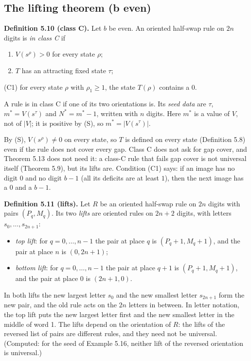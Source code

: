 \documentclass[11pt,letterpaper]{article}
\providecommand{\tightlist}{%
  \setlength{\itemsep}{0pt}\setlength{\parskip}{0pt}}
\theoremstyle{paperstyle}
\theoremstyle{paperstyledef}
\theoremstyle{paperstylerem}
\begin{document}
\subsection{The lifting theorem (b even)}\label{the-lifting-theorem-b-even}

\textbf{Definition 5.10 (class C).} Let \(b\) be even. An oriented half-swap rule on \(2n\) digits is \emph{in class C} if

\begin{enumerate}
\def\labelenumi{(\Alph{enumi})}
\setcounter{enumi}{18}
\item
  \(V(s^\rho) > 0\) for every state \(\rho\);
\item
  \(T\) has an attracting fixed state \(\tau\);
\end{enumerate}

(C1) for every state \(\rho\) with \(\rho_1 \ge 1\), the state \(T(\rho)\) contains a \(0\).

A rule is in class C if one of its two orientations is. Its \emph{seed data} are \(\tau\), \(m^* = V(s^\tau)\) and \(N^* = m^* - 1\), written with \(n\) digits. Here \(m^*\) is a value of \(V\), not of \(|V|\); it is positive by (S), so \(m^* = |V(s^\tau)|\).

By (S), \(V(s^\rho) \ne 0\) on every state, so \(T\) is defined on every state (Definition 5.8) even if the rule does not cover every gap. Class C does not ask for gap cover, and Theorem 5.13 does not need it: a class-C rule that fails gap cover is not universal itself (Theorem 5.9), but its lifts are. Condition (C1) says: if an image has no digit \(0\) and no digit \(b-1\) (all its deficits are at least \(1\)), then the next image has a \(0\) and a \(b-1\).

\textbf{Definition 5.11 (lifts).} Let \(R\) be an oriented half-swap rule on \(2n\) digits with pairs \((P_q, M_q)\). Its two \emph{lifts} are oriented rules on \(2n+2\) digits, with letters \(s_0, \dots, s_{2n+1}\):

\begin{itemize}
\tightlist
\item
  \emph{top lift}: for \(q = 0, \dots, n-1\) the pair at place \(q\) is \((P_q + 1, M_q + 1)\), and the pair at place \(n\) is \((0, 2n+1)\);
\item
  \emph{bottom lift}: for \(q = 0, \dots, n-1\) the pair at place \(q+1\) is \((P_q + 1, M_q + 1)\), and the pair at place \(0\) is \((2n+1, 0)\).
\end{itemize}

In both lifts the new largest letter \(s_0\) and the new smallest letter \(s_{2n+1}\) form the new pair, and the old rule acts on the \(2n\) letters in between. In letter notation, the top lift puts the new largest letter first and the new smallest letter in the middle of word 1. The lifts depend on the orientation of \(R\): the lifts of the reversed list of pairs are different rules, and they need not be universal. (Computed: for the seed of Example 5.16, neither lift of the reversed orientation is universal.)
\end{document}
